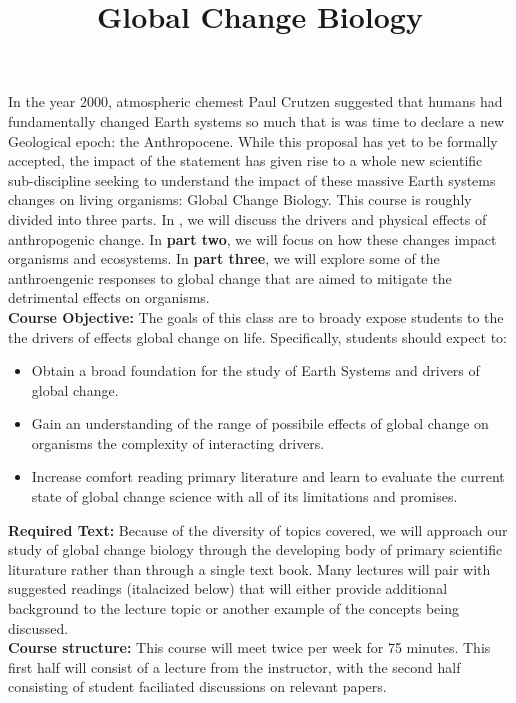 \documentclass{article}\usepackage[]{graphicx}\usepackage[]{color}
\begin{document}
\title{Global Change Biology}
\date{}
\maketitle{}
\indent In the year 2000, atmospheric chemest Paul Crutzen suggested that humans had fundamentally changed Earth systems so much that is was time to declare a new Geological epoch: the Anthropocene. While this proposal has yet to be formally accepted, the impact of the statement has given rise to a whole new scientific sub-discipline seeking to understand the impact of these massive Earth systems changes on living organisms: Global Change Biology. This course is roughly divided into three parts. In , we will discuss the drivers and physical effects of anthropogenic change. In \textbf{part two}, we will focus on how these changes impact organisms and ecosystems. In \textbf{part three}, we will explore some of the anthroengenic responses to global change that are aimed to mitigate the detrimental effects on organisms. \\

\indent\textbf{Course Objective:} The goals of this class are to broady expose students to the the  drivers of effects global change on life. Specifically, students should expect to:
\begin{itemize}
\item Obtain a broad foundation for the study of Earth Systems and drivers of global change.
\item Gain an understanding of the range of possibile effects of global change on organisms the complexity of interacting drivers.
\item Increase comfort reading primary literature and learn to evaluate the current state of global change science with all of its limitations and promises.
\end{itemize}

\textbf{Required Text:} Because of the diversity of topics covered, we will approach our study of global change biology through the developing body of primary scientific liturature rather than through a single text book. Many lectures will pair with suggested readings (italacized below) that will either provide additional background to the lecture topic or another example of the concepts being discussed.\\

\textbf{Course structure:} This course will meet twice per week for 75 minutes. This first half will consist of a lecture from the instructor, with the second half consisting of student faciliated discussions on relevant papers.\\
\end{document}
